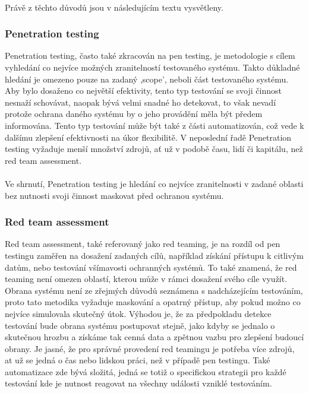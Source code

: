 \paragraph{}
Právě z těchto důvodů jsou v následujícím textu vysvětleny.

\subsubsection{Penetration testing}

Penetration testing, často také zkracován na pen testing, je metodologie s cílem vyhledání co nejvíce možných zranitelností testovaného systému.
Takto důkladné hledání je omezeno pouze na zadaný ,scope', neboli část testovaného systému.
Aby bylo dosaženo co největší efektivity, tento typ testování se svoji činnost nesnaží schovávat, naopak bývá velmi snadné ho detekovat, to však nevadí protože ochrana daného systému by o jeho provádění měla být předem informována.
Tento typ testování může být také z části automatizován, což vede k dalšímu zlepšení efektivnosti na úkor flexibilitě.
V neposlední řadě Penetration testing vyžaduje menší množství zdrojů, ať už v podobě času, lidí či kapitálu, než red team assessment.
\paragraph{}
Ve shrnutí, Penetration testing je hledání co nejvíce zranitelnosti v zadané oblasti bez nutnosti svoji činnost maskovat před ochranou systému.\cite{securityInteligence_pen_test_red_team_purple_team, lootsec_pen_test_vs_red_team, astra_pen_test_vs_red_teaming}


\subsubsection{Red team assessment}

Red team assessment, také referovaný jako red teaming, je na rozdíl od pen testingu zaměřen na dosažení zadaných cílů, například získání přístupu k citlivým datům, nebo testování všímavosti ochranných systémů.
To také znamená, že red teaming není omezen oblastí, kterou může v rámci dosažení svého cíle využít.
Obrana systému není ze zřejmých důvodů seznámena s nadcházejícím testováním, proto tato metodika vyžaduje maskování a opatrný přístup, aby pokud možno co nejvíce simulovala skutečný útok.
Výhodou je, že za předpokladu detekce testování bude obrana systému postupovat stejně, jako kdyby se jednalo o skutečnou hrozbu a získáme tak cenná data a zpětnou vazbu pro zlepšení budoucí obrany.
Je jasné, že pro správné provedení red teamingu je potřeba více zdrojů, at už se jedná o čas nebo lidskou práci, než v případě pen testingu.
Také automatizace zde bývá složitá, jedná se totiž o specifickou strategii pro každé testování kde je nutnost reagovat na všechny události vzniklé testováním.\cite{securityInteligence_pen_test_red_team_purple_team, lootsec_pen_test_vs_red_team, astra_pen_test_vs_red_teaming}

